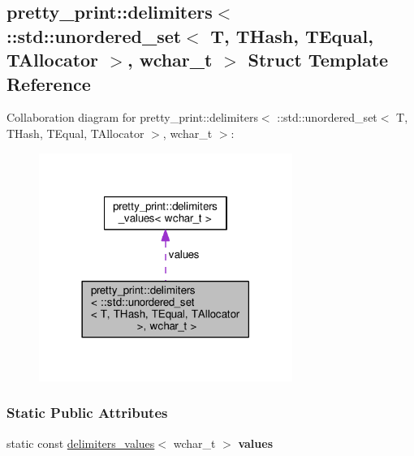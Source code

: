 \hypertarget{structpretty__print_1_1delimiters_3_01_1_1std_1_1unordered__set_3_01T_00_01THash_00_01TEqual_00_b9dca71ea935633d29c7d36890ecd10a}{}\subsection{pretty\+\_\+print\+:\+:delimiters$<$ \+:\+:std\+:\+:unordered\+\_\+set$<$ T, T\+Hash, T\+Equal, T\+Allocator $>$, wchar\+\_\+t $>$ Struct Template Reference}
\label{structpretty__print_1_1delimiters_3_01_1_1std_1_1unordered__set_3_01T_00_01THash_00_01TEqual_00_b9dca71ea935633d29c7d36890ecd10a}


Collaboration diagram for pretty\+\_\+print\+:\+:delimiters$<$ \+:\+:std\+:\+:unordered\+\_\+set$<$ T, T\+Hash, T\+Equal, T\+Allocator $>$, wchar\+\_\+t $>$\+:\nopagebreak
\begin{figure}[H]
\begin{center}
\leavevmode
\includegraphics[width=234pt]{structpretty__print_1_1delimiters_3_01_1_1std_1_1unordered__set_3_01T_00_01THash_00_01TEqual_00_2466888a20c583147ded04daed07d319}
\end{center}
\end{figure}
\subsubsection*{Static Public Attributes}
\begin{DoxyCompactItemize}
\item 
static const \hyperlink{structpretty__print_1_1delimiters__values}{delimiters\+\_\+values}$<$ wchar\+\_\+t $>$ {\bfseries values}\hypertarget{structpretty__print_1_1delimiters_3_01_1_1std_1_1unordered__set_3_01T_00_01THash_00_01TEqual_00_b9dca71ea935633d29c7d36890ecd10a_a80937537e70dbaf536e25d94b6a5fc64}{}\label{structpretty__print_1_1delimiters_3_01_1_1std_1_1unordered__set_3_01T_00_01THash_00_01TEqual_00_b9dca71ea935633d29c7d36890ecd10a_a80937537e70dbaf536e25d94b6a5fc64}

\end{DoxyCompactItemize}


